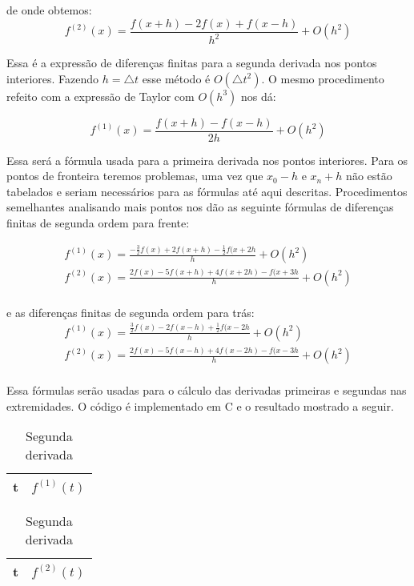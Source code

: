 de onde obtemos:
\begin{equation}
  f^{(2)}(x) = \frac{f(x+h) - 2f(x) + f(x-h)}{h^2} + O(h^2)
\end{equation}

Essa é a expressão de diferenças finitas para a segunda derivada nos pontos interiores.
Fazendo $h =\triangle t$ esse método é $O(\triangle t^2)$. O mesmo procedimento
refeito com a expressão de Taylor com $O(h ^3)$ nos dá:

\begin{equation}
  f^{(1)}(x) = \frac{f(x+h) - f(x-h)}{2h} + O(h^2)
\end{equation}

Essa será a fórmula usada para a primeira derivada nos pontos interiores. Para os
pontos de fronteira teremos problemas, uma vez que $x_0-h$ e $x_n+h$ não estão tabelados
e seriam necessários para as fórmulas até aqui descritas. Procedimentos semelhantes
analisando mais pontos nos dão as seguinte fórmulas de diferenças finitas de
segunda ordem para frente:

\begin{equation}
  \begin{array}{l}
  f^{(1)}(x) = \frac{-\frac{3}{2}f(x) + 2f(x+h) -\frac{1}{2} f(x+2h}{h} + O(h^2) \\
  f^{(2)}(x) = \frac{2f(x) -5 f(x+h) +4 f(x+2h) - f(x+3h}{h} + O(h^2) \\
  \end{array}
\end{equation}

e as diferenças finitas de segunda ordem para trás:
\begin{equation}
  \begin{array}{l}
  f^{(1)}(x) = \frac{\frac{3}{2}f(x) - 2f(x-h) +\frac{1}{2} f(x-2h}{h} + O(h^2) \\
  f^{(2)}(x) = \frac{2f(x) -5 f(x-h) +4 f(x-2h) - f(x-3h}{h} + O(h^2) \\
  \end{array}
\end{equation}

Essa fórmulas serão usadas para o cálculo das derivadas primeiras e segundas nas extremidades.
O código é implementado em C e o resultado mostrado a seguir.

\FloatBarrier
\begin{table}
\parbox{.45\linewidth}
		{
		\centering
		\begin{tabular}{|l|l|}\hline
			t & $f^{(1)}(t)$ \\ \hline
			
		\end{tabular}
		\caption{Primeira derivada}
		\label{tab:quest1-X1}
		}
\parbox{.45\linewidth}
	{
	\centering
		\begin{tabular}{|l|l|}\hline
			t & $f^{(2)}(t)$ \\ \hline
			
		\end{tabular}
		\caption{Segunda derivada}
		\label{tab:quest1-X2}	
	}
	

\end{table}

